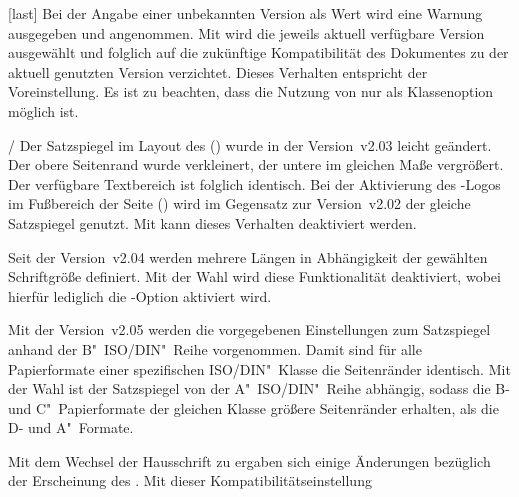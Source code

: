 \begin{Declaration*}{}
\begin{Declaration*}{}
\begin{Declaration*}{}
\begin{Declaration}[v2.03]{}[last]
Bei der Angabe einer unbekannten Version als Wert wird eine Warnung ausgegeben 
und  angenommen. Mit  wird die 
jeweils aktuell verfügbare Version ausgewählt und folglich auf die zukünftige 
Kompatibilität des Dokumentes zu der aktuell genutzten Version verzichtet. 
Dieses Verhalten entspricht der Voreinstellung. Es ist zu beachten, dass die 
Nutzung von  nur als Klassenoption möglich ist.
%
\begin{values}{}
\item[\PValue{first}/\PValue{2.02}]
  Der Satzspiegel im Layout des \CDs () wurde in 
  der Version~v2.03 leicht geändert. Der obere Seitenrand wurde verkleinert, 
  der untere im gleichen Maße vergrößert. Der verfügbare Textbereich ist 
  folglich identisch. Bei der Aktivierung des \DDC-Logos im Fußbereich der 
  Seite () wird im Gegensatz zur Version~v2.02 der 
  gleiche Satzspiegel genutzt. Mit  kann dieses 
  Verhalten deaktiviert werden.
\item[\PValue{2.03}]
  Seit der Version~v2.04 werden mehrere Längen in Abhängigkeit der gewählten 
  Schriftgröße definiert. Mit der Wahl  wird diese 
  Funktionalität deaktiviert, wobei hierfür lediglich die \TUDScript-Option 
   aktiviert wird. 
\item[\PValue{2.04}]
  Mit der Version~v2.05 werden die vorgegebenen Einstellungen zum Satzspiegel 
  anhand der B"~ISO/DIN"~Reihe vorgenommen. Damit sind für alle Papierformate 
  einer spezifischen ISO/DIN"~Klasse die Seitenränder identisch. Mit der Wahl 
   ist der Satzspiegel von der A"~ISO/DIN"~Reihe 
  abhängig, sodass die B- und C"~Papierformate der gleichen Klasse größere 
  Seitenränder erhalten, als die D- und A"~Formate.
\item[\PValue{2.05}]
  Mit dem Wechsel der Hausschrift zu \OpenSans ergaben sich einige Änderungen 
  bezüglich der Erscheinung des \CDs. Mit dieser Kompatibilitätseinstellung 

\end{values}
\end{Declaration}
\end{Declaration*}
\end{Declaration*}
\end{Declaration*}
